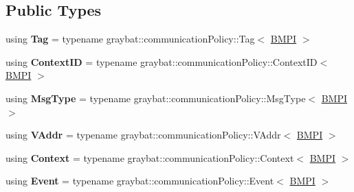 \subsection*{Public Types}
\begin{DoxyCompactItemize}
\item 
\hypertarget{structgraybat_1_1communicationPolicy_1_1BMPI_a8d250a80c1b23afea7da0aad7f008d00}{}using {\bfseries Tag} = typename graybat\+::communication\+Policy\+::\+Tag$<$ \hyperlink{structgraybat_1_1communicationPolicy_1_1BMPI}{B\+M\+P\+I} $>$\label{structgraybat_1_1communicationPolicy_1_1BMPI_a8d250a80c1b23afea7da0aad7f008d00}

\item 
\hypertarget{structgraybat_1_1communicationPolicy_1_1BMPI_a330e0f2f8ec3428af2ea9dd2d5695175}{}using {\bfseries Context\+I\+D} = typename graybat\+::communication\+Policy\+::\+Context\+I\+D$<$ \hyperlink{structgraybat_1_1communicationPolicy_1_1BMPI}{B\+M\+P\+I} $>$\label{structgraybat_1_1communicationPolicy_1_1BMPI_a330e0f2f8ec3428af2ea9dd2d5695175}

\item 
\hypertarget{structgraybat_1_1communicationPolicy_1_1BMPI_ac8cba626cca2151ace6a47bd0e51b64b}{}using {\bfseries Msg\+Type} = typename graybat\+::communication\+Policy\+::\+Msg\+Type$<$ \hyperlink{structgraybat_1_1communicationPolicy_1_1BMPI}{B\+M\+P\+I} $>$\label{structgraybat_1_1communicationPolicy_1_1BMPI_ac8cba626cca2151ace6a47bd0e51b64b}

\item 
\hypertarget{structgraybat_1_1communicationPolicy_1_1BMPI_ac214b2b6b3b852c387ebb3e3512555f2}{}using {\bfseries V\+Addr} = typename graybat\+::communication\+Policy\+::\+V\+Addr$<$ \hyperlink{structgraybat_1_1communicationPolicy_1_1BMPI}{B\+M\+P\+I} $>$\label{structgraybat_1_1communicationPolicy_1_1BMPI_ac214b2b6b3b852c387ebb3e3512555f2}

\item 
\hypertarget{structgraybat_1_1communicationPolicy_1_1BMPI_a571329de1fa15aa9e8fedcd9d70c6cb1}{}using {\bfseries Context} = typename graybat\+::communication\+Policy\+::\+Context$<$ \hyperlink{structgraybat_1_1communicationPolicy_1_1BMPI}{B\+M\+P\+I} $>$\label{structgraybat_1_1communicationPolicy_1_1BMPI_a571329de1fa15aa9e8fedcd9d70c6cb1}

\item 
\hypertarget{structgraybat_1_1communicationPolicy_1_1BMPI_afbdda3b27c1c7a556ea87368a0e02c3e}{}using {\bfseries Event} = typename graybat\+::communication\+Policy\+::\+Event$<$ \hyperlink{structgraybat_1_1communicationPolicy_1_1BMPI}{B\+M\+P\+I} $>$\label{structgraybat_1_1communicationPolicy_1_1BMPI_afbdda3b27c1c7a556ea87368a0e02c3e}


\end{DoxyCompactItemize}
